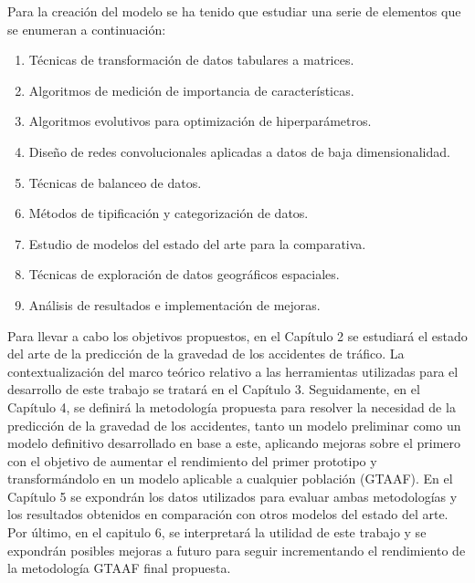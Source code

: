 \documentclass{uathesis-es}
\begin{document}

Para la creación del modelo se ha tenido que estudiar una serie de elementos que se enumeran a continuación:

\begin{enumerate}
    \item Técnicas de transformación de datos tabulares a matrices.
    \item Algoritmos de medición de importancia de características. 
    \item Algoritmos evolutivos para optimización de hiperparámetros.
    \item Diseño de redes convolucionales aplicadas a datos de baja dimensionalidad.
    \item Técnicas de balanceo de datos.
    \item Métodos de tipificación y categorización de datos.
    \item Estudio de modelos del estado del arte para la comparativa. 
    \item Técnicas de exploración de datos geográficos espaciales.
    \item Análisis de resultados e implementación de mejoras.
\end{enumerate}


Para llevar a cabo los objetivos propuestos, en el Capítulo 2 se estudiará el estado del arte de la predicción de la gravedad de los accidentes de tráfico. La contextualización del marco teórico relativo a las herramientas utilizadas para el desarrollo de este trabajo se tratará en el Capítulo 3. Seguidamente, en el Capítulo 4, se definirá la metodología propuesta para resolver la necesidad de la predicción de la gravedad de los accidentes, tanto un modelo preliminar como un modelo definitivo desarrollado en base a este, aplicando mejoras sobre el primero con el objetivo de aumentar el rendimiento del primer prototipo y transformándolo en un modelo aplicable a cualquier población (GTAAF). En el Capítulo 5 se expondrán los datos utilizados para evaluar ambas metodologías y los resultados obtenidos en comparación con otros modelos del estado del arte. Por último, en el capitulo 6, se interpretará la utilidad de este trabajo y se expondrán posibles mejoras a futuro para seguir incrementando el rendimiento de la metodología GTAAF final propuesta.
\end{document}
